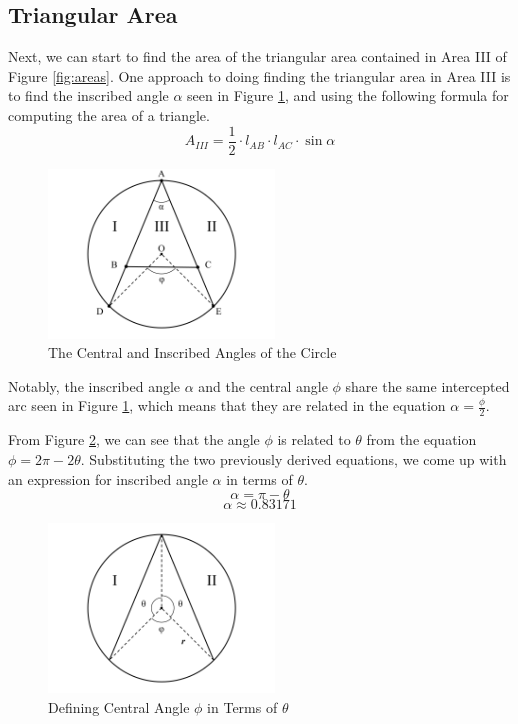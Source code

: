 \documentclass[a4paper,11pt]{article}
\begin{document}
\subsection*{Triangular Area}

Next, we can start to find the area of the triangular area contained in Area III of Figure \ref{fig:areas}.  One approach to doing finding the triangular area in Area III is to find the inscribed angle $\alpha$ seen in Figure \ref{fig:alpha}, and using the following formula for computing the area of a triangle.
\[A_{III} = \frac{1}{2} \cdot l_{AB} \cdot l_{AC} \cdot \sin{\alpha}\]

\begin{figure}[htp]
    \centering
    \includegraphics[width=6cm]{Images/Central_Angle.png}
    \caption{The Central and Inscribed Angles of the Circle}
    \label{fig:alpha}
\end{figure}

Notably, the inscribed angle $\alpha$ and the central angle $\phi$ share the same intercepted arc seen in Figure \ref{fig:alpha}, which means that they are related in the equation $\alpha = \frac{\phi}{2}$.

From Figure \ref{fig:phi}, we can see that the angle $\phi$ is related to $\theta$ from the equation $\phi = 2\pi - 2\theta$.  Substituting the two previously derived equations, we come up with an expression for inscribed angle $\alpha$ in terms of $\theta$.
\[\alpha = \pi - \theta\]
\[\alpha \approx 0.83171\]

\begin{figure}[htp]
    \centering
    \includegraphics[width=6cm]{Images/2020_05_22_Riddler_Express_Phi.png}
    \caption{Defining Central Angle $\phi$ in Terms of $\theta$}
    \label{fig:phi}
\end{figure}
\end{document}
